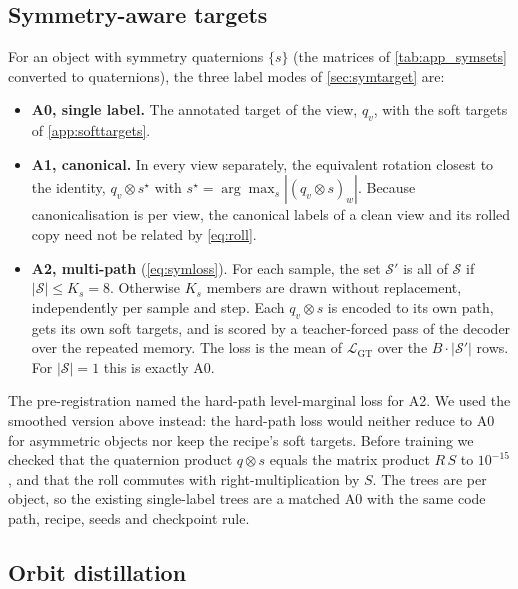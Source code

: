 \subsection{Symmetry-aware targets}\label{app:symtarget}

For an object with symmetry quaternions $\{s\}$ (the matrices of \cref{tab:app_symsets} converted to quaternions), the three label modes of \cref{sec:symtarget} are:
\begin{itemize}
  \item \textbf{A0, single label.} The annotated target of the view, $q_v$, with the soft targets of \cref{app:softtargets}.
  \item \textbf{A1, canonical.} In every view separately, the equivalent rotation closest to the identity, $q_v\otimes s^\star$ with $s^\star=\arg\max_s|(q_v\otimes s)_w|$. Because canonicalisation is per view, the canonical labels of a clean view and its rolled copy need not be related by \cref{eq:roll}.
  \item \textbf{A2, multi-path} (\cref{eq:symloss}). For each sample, the set $\mathcal{S}'$ is all of $\mathcal{S}$ if $|\mathcal{S}|\le K_s=8$. Otherwise $K_s$ members are drawn without replacement, independently per sample and step. Each $q_v\otimes s$ is encoded to its own path, gets its own soft targets, and is scored by a teacher-forced pass of the decoder over the repeated memory. The loss is the mean of $\mathcal{L}_{\text{GT}}$ over the $B\cdot|\mathcal{S}'|$ rows. For $|\mathcal{S}|=1$ this is exactly A0.
\end{itemize}
The pre-registration named the hard-path level-marginal loss for A2. We used the smoothed version above instead: the hard-path loss would neither reduce to A0 for asymmetric objects nor keep the recipe's soft targets. Before training we checked that the quaternion product $q\otimes s$ equals the matrix product $R\,S$ to $10^{-15}$, and that the roll commutes with right-multiplication by $S$. The trees are per object, so the existing single-label trees are a matched A0 with the same code path, recipe, seeds and checkpoint rule.

\subsection{Orbit distillation}\label{app:distill}


